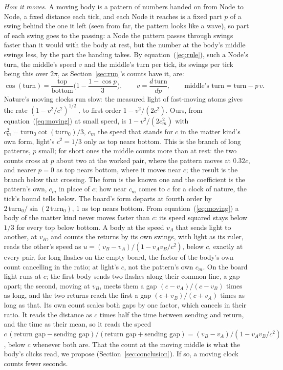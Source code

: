 \documentclass[pdflatex,sn-mathphys-num]{sn-jnl}
\begin{document}
\textit{How it moves.} A moving body is a pattern of numbers handed on from Node to Node, a fixed distance each tick, and each Node it reaches is a fixed part $p$ of a swing behind the one it left (seen from far, the pattern looks like a wave), so part of each swing goes to the passing: a Node the pattern passes through swings faster than it would with the body at rest, but the number at the body's middle swings less, by the part the handing takes. By equation~(\ref{eq:rule}), such a Node's turn, the middle's speed $v$ and the middle's turn per tick, its swings per tick being this over $2\pi$, as Section~\ref{sec:run}'s counts have it, are:
\begin{equation}\label{eq:moving}
\cos(\mathrm{turn}) = \frac{\mathrm{top}}{\mathrm{bottom}}\Big(1 - \frac{1 - \cos p}{3}\Big), \qquad v = \frac{d\,\mathrm{turn}}{d p}, \qquad \text{middle's turn} = \mathrm{turn} - p\,v.
\end{equation}
Nature's moving clocks run slow: the measured light of fast-moving atoms \cite{ives1938} gives the rate $(1 - v^2/c^2)^{1/2}$ \cite{einstein1905}, to first order $1 - v^2/(2c^2)$. Ours, from equation~(\ref{eq:moving}) at small speed, is $1 - v^2/(2c_m^2)$ with $c_m^2 = \mathrm{turn}_0 \cot(\mathrm{turn}_0)/3$, $c_m$ the speed that stands for $c$ in the matter kind's own form, light's $c^2 = 1/3$ only as top nears bottom. This is the branch of long patterns, $p$ small; for short ones the middle counts more than at rest: the two counts cross at $p$ about two at the worked pair, where the pattern moves at $0.32c$, and nearer $p = 0$ as top nears bottom, where it moves near $c$; the result is the branch below that crossing. The form is the known one and the coefficient is the pattern's own, $c_m$ in place of $c$; how near $c_m$ comes to $c$ for a clock of nature, the tick's bound tells below. The board's form departs at fourth order by $2\,\mathrm{turn}_0/\sin(2\,\mathrm{turn}_0)$, 1 as top nears bottom. From equation~(\ref{eq:moving}) a body of the matter kind never moves faster than $c$: its speed squared stays below $1/3$ for every top below bottom. A body at the speed $v_A$ that sends light to another, at $v_B$, and counts the returns by its own swings, with light as its ruler, reads the other's speed as $u = (v_B - v_A)/(1 - v_A v_B/c^2)$, below $c$, exactly at every pair, for long flashes on the empty board, the factor of the body's own count cancelling in the ratio; at light's $c$, not the pattern's own $c_m$. On the board light runs at $c$; the first body sends two flashes along their common line, a gap apart; the second, moving at $v_B$, meets them a gap $(c - v_A)/(c - v_B)$ times as long, and the two returns reach the first a gap $(c + v_B)/(c + v_A)$ times as long as that. Its own count scales both gaps by one factor, which cancels in their ratio. It reads the distance as $c$ times half the time between sending and return, and the time as their mean, so it reads the speed $c\,(\text{return gap} - \text{sending gap})/(\text{return gap} + \text{sending gap}) = (v_B - v_A)/(1 - v_A v_B/c^2)$, below $c$ whenever both are. That the count at the moving middle is what the body's clicks read, we propose (Section~\ref{sec:conclusion}). If so, a moving clock counts fewer seconds.
\end{document}
